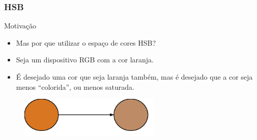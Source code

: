 \documentclass{beamer}
\begin{document}
\begin{frame}
\frametitle{HSB}
		\begin{block}{Motivação}
			\begin{itemize}
				\item Mas por que utilizar o espaço de cores HSB?
			\end{itemize}
		\end{block}
		
		\begin{block}{}
			\begin{itemize}
				\item Seja um dispositivo RGB com a cor laranja.
				\item É desejado uma cor que seja laranja também, mas é desejado que a cor seja menos ``colorida'', ou menos saturada.
			\end{itemize}
		\end{block}
		
		\begin{figure}[!h]
			\begin{center}
				\includegraphics[width=0.6\textwidth]{Figures/Orange}
			\end{center}
		\end{figure}			
	
\end{frame}
\end{document}
